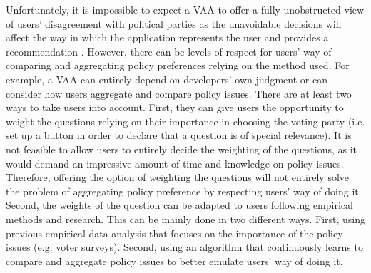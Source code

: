 \documentclass{scrartcl}
\begin{document}
Unfortunately, it is impossible to expect a VAA to offer a fully unobstructed view of users' disagreement with political parties as the unavoidable decisions will affect the way in which the application represents the user and provides a recommendation \cite{fossen2015electoral}. However, there can be levels of respect for users' way of comparing and aggregating policy preferences relying on the method used. For example, a VAA can entirely depend on developers' own judgment or can consider how users aggregate and compare policy issues. There are at least two ways to take users into account. First, they can give users the opportunity to weight the questions relying on their importance in choosing the voting party (i.e. set up a button in order to declare that a question is of special relevance). It is not feasible to allow users to entirely decide the weighting of the questions, as it would demand an impressive amount of time and knowledge on policy issues. Therefore, offering the option of weighting the questions will not entirely solve the problem of aggregating policy preference by respecting users' way of doing it. Second, the weights of the question can be adapted to users following empirical methods and research. This can be mainly done in two different ways. First, using previous empirical data analysis that focuses on the importance of the policy issues (e.g. voter surveys). Second, using an algorithm that continuously learns to compare and aggregate policy issues to better emulate users' way of doing it. 
\end{document}

